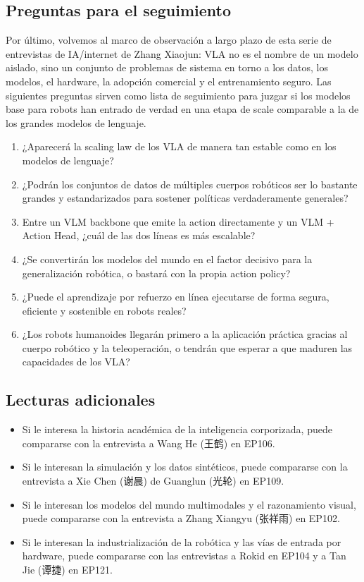 \documentclass[a4paper]{article}
\begin{document}
\subsection{Preguntas para el seguimiento}

Por último, volvemos al marco de observación a largo plazo de esta serie de entrevistas de IA/internet de Zhang Xiaojun: VLA no es el nombre de un modelo aislado, sino un conjunto de problemas de sistema en torno a los datos, los modelos, el hardware, la adopción comercial y el entrenamiento seguro. Las siguientes preguntas sirven como lista de seguimiento para juzgar si los modelos base para robots han entrado de verdad en una etapa de scale comparable a la de los grandes modelos de lenguaje.

\begin{enumerate}
\item ¿Aparecerá la scaling law de los VLA de manera tan estable como en los modelos de lenguaje?
\item ¿Podrán los conjuntos de datos de múltiples cuerpos robóticos ser lo bastante grandes y estandarizados para sostener políticas verdaderamente generales?
\item Entre un VLM backbone que emite la action directamente y un VLM + Action Head, ¿cuál de las dos líneas es más escalable?
\item ¿Se convertirán los modelos del mundo en el factor decisivo para la generalización robótica, o bastará con la propia action policy?
\item ¿Puede el aprendizaje por refuerzo en línea ejecutarse de forma segura, eficiente y sostenible en robots reales?
\item ¿Los robots humanoides llegarán primero a la aplicación práctica gracias al cuerpo robótico y la teleoperación, o tendrán que esperar a que maduren las capacidades de los VLA?
\end{enumerate}

\subsection{Lecturas adicionales}

\begin{itemize}
\item Si le interesa la historia académica de la inteligencia corporizada, puede compararse con la entrevista a Wang He (王鹤) en EP106.
\item Si le interesan la simulación y los datos sintéticos, puede compararse con la entrevista a Xie Chen (谢晨) de Guanglun (光轮) en EP109.
\item Si le interesan los modelos del mundo multimodales y el razonamiento visual, puede compararse con la entrevista a Zhang Xiangyu (张祥雨) en EP102.
\item Si le interesan la industrialización de la robótica y las vías de entrada por hardware, puede compararse con las entrevistas a Rokid en EP104 y a Tan Jie (谭捷) en EP121.
\end{itemize}
\end{document}
